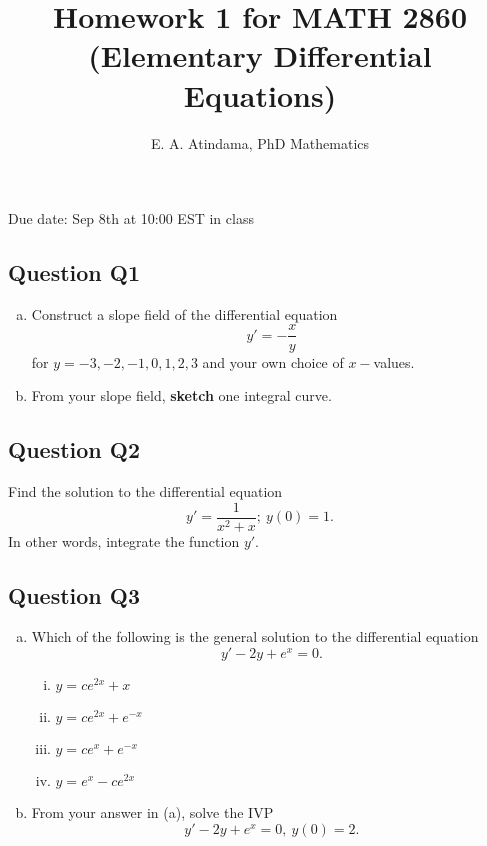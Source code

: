 \documentclass[a4paper,11pt,reqno]{amsart}
\title[MATH 2860 (Elementary Differential Equations)]{Homework 1 for MATH 2860 (Elementary Differential Equations)}
\author[Emmanuel Atindama]{E. A. Atindama, PhD Mathematics}
\numberwithin{equation}{section}
\begin{document}
\maketitle

Due date: Sep 8th at 10:00 EST in class

\subsection*{Question Q1}
\begin{enumerate}[a)]
    \item Construct a slope field of the differential equation
        \[
        y' = -\frac{x}{y}
        \]
    for \(y=-3, -2, -1, 0, 1, 2, 3\) and your own choice of \(x-\)values.  
    \item From your slope field, \textbf{sketch} one integral curve.
\end{enumerate}

\subsection*{Question Q2}
    Find the solution to the differential equation
    \[
    y' = \frac{1}{x^2 + x}; \: y(0) = 1.
    \]
   In other words, integrate the function \(y'\).


\subsection*{Question Q3}
    \begin{enumerate}[a)]
        \item Which of the following is the general solution to the differential equation
            \[
            y' -2y +e^x = 0.
            \]
           \begin{enumerate}[i)]
               \item \(y = ce^{2x} + x\)
               \item \(y = ce^{2x} + e^{-x}\)
               \item \(y = ce^{x} + e^{-x}\)
               \item \(y = e^x - ce^{2x} \)
           \end{enumerate}
       \item From your answer in (a), solve the IVP
            \[
            y' -2y +e^x = 0, \: y(0) = 2.
            \]
    \end{enumerate}
\end{document}
